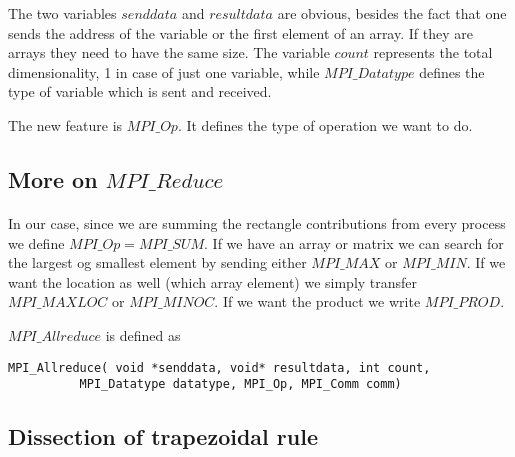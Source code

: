 \documentclass[%
oneside,                 %
final,                   %
10pt]{article}
\begin{document}
The two variables $senddata$ and $resultdata$ are obvious, besides the fact that one sends the address
of the variable or the first element of an array.  If they are arrays they need to have the same size. 
The variable $count$ represents the total dimensionality, 1 in case of just one variable, 
while $MPI\_Datatype$ 
defines the type of variable which is sent and received.  

The new feature is $MPI\_Op$. It defines the type
of operation we want to do.



\subsection*{More on $MPI\_Reduce$}

\paragraph{}
In our case, since we are summing
the rectangle  contributions from every process we define  $MPI\_Op = MPI\_SUM$.
If we have an array or matrix we can search for the largest og smallest element by sending either $MPI\_MAX$ or 
$MPI\_MIN$.  If we want the location as well (which array element) we simply transfer 
$MPI\_MAXLOC$ or $MPI\_MINOC$. If we want the product we write $MPI\_PROD$. 

$MPI\_Allreduce$ is defined as



\begin{verbatim}
MPI_Allreduce( void *senddata, void* resultdata, int count, 
          MPI_Datatype datatype, MPI_Op, MPI_Comm comm)        

\end{verbatim}



\subsection*{Dissection of trapezoidal rule}

\paragraph{}
\end{document}
